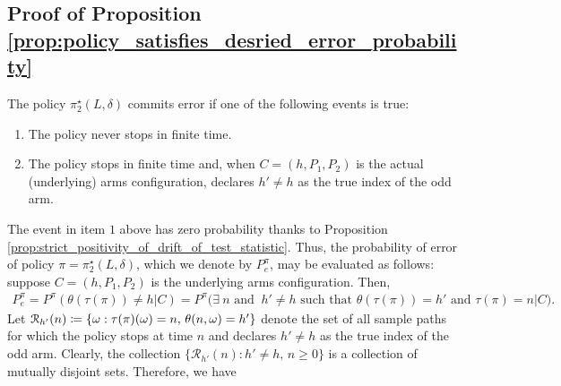 \subsection{Proof of Proposition \ref{prop:policy_satisfies_desried_error_probability}}
\label{appndx:proof_of_prop_policy_satisfies_desired_error_prob}
  The policy $\pi_2^\star(L,\delta)$ commits error if one of the following events is true:
\begin{enumerate}
	\item The policy never stops in finite time.
	\item The policy stops in finite time and, when $C=(h, P_1, P_2)$ is the actual (underlying) arms configuration, declares $h'\neq h$ as the true index of the odd arm.
\end{enumerate}
The event in item $1$ above has zero probability thanks to Proposition \ref{prop:strict_positivity_of_drift_of_test_statistic}.
Thus, the probability of error of policy $\pi=\pi_2^\star(L,\delta)$, which we denote by $P^\pi_e$, may be evaluated as follows: suppose $C=(h,P_1,P_2)$ is the underlying arms configuration. Then,
\begingroup\allowdisplaybreaks\begin{align}
	P^\pi_e =P^\pi(\theta(\tau(\pi))\neq h|C)
	=P^\pi\bigg(\exists~ n\text{ and }~h'\neq h\text{ such that }
	\theta(\tau(\pi))=h'\text{ and } \tau(\pi)=n\bigg\vert C\bigg).\label{eq:P_e_partial_1}
\end{align}\endgroup
Let $\mathcal{R}_{h'}(n)\coloneqq\{\omega:\tau(\pi)(\omega)=n,\,\theta(n,\omega)=h'\}\label{eq:R_{h'}(n)}$ denote the set of all sample paths for which the policy stops at time $n$ and declares $h'\neq h$ as the true index of the odd arm. Clearly, the collection $\{\mathcal{R}_{h'}(n):h'\neq h,\,n\geq 0\}$ is a collection of mutually disjoint sets. Therefore, we have
